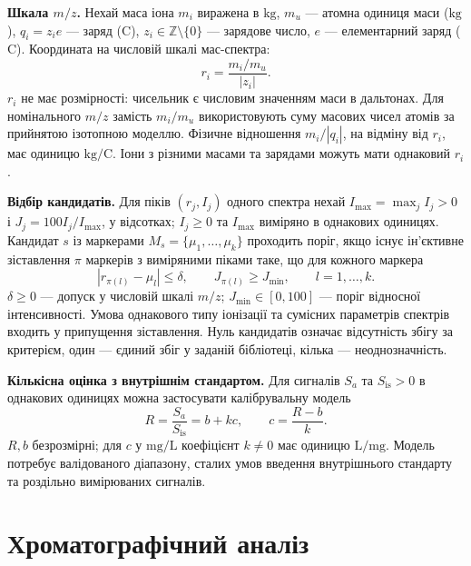 \documentclass[11pt,a4paper]{article}
\begin{document}
\textbf{Шкала \(m/z\).}
Нехай маса іона \(m_i\) виражена в \(\mathrm{kg}\),
\(m_u\) --- атомна одиниця маси (\(\mathrm{kg}\)),
\(q_i=z_i e\) --- заряд (\(\mathrm{C}\)), \(z_i\in\mathbb Z\setminus\{0\}\)
--- зарядове число, \(e\) --- елементарний заряд (\(\mathrm{C}\)).
Координата на числовій шкалі мас-спектра:
\[
  r_i=\frac{m_i/m_u}{|z_i|}.
\]
\(r_i\) не має розмірності: чисельник є числовим значенням
маси в дальтонах. Для номінального \(m/z\) замість \(m_i/m_u\)
використовують суму масових чисел атомів за прийнятою ізотопною
моделлю. Фізичне відношення \(m_i/|q_i|\), на відміну від \(r_i\),
має одиницю \(\mathrm{kg/C}\).
Іони з різними масами та зарядами можуть мати однаковий \(r_i\).

\textbf{Відбір кандидатів.}
Для піків \((r_j,I_j)\) одного спектра нехай
\(I_{\max}=\max_j I_j>0\) і \(J_j=100 I_j/I_{\max}\), у відсотках;
\(I_j\ge0\) та \(I_{\max}\) виміряно в однакових одиницях.
Кандидат \(s\) із маркерами \(M_s=\{\mu_1,\ldots,\mu_k\}\)
проходить поріг, якщо існує ін'єктивне зіставлення \(\pi\)
маркерів з виміряними піками таке, що для кожного маркера
\[
   |r_{\pi(l)}-\mu_l|\le \delta,\qquad
   J_{\pi(l)}\ge J_{\min},\qquad l=1,\ldots,k.
\]
\(\delta\ge0\) --- допуск у числовій шкалі \(m/z\);
\(J_{\min}\in[0,100]\) --- поріг відносної інтенсивності.
Умова однакового типу іонізації та сумісних параметрів
спектрів входить у припущення зіставлення.
Нуль кандидатів означає відсутність збігу за критерієм,
один --- єдиний збіг у заданій бібліотеці,
кілька --- неоднозначність.

\textbf{Кількісна оцінка з внутрішнім стандартом.}
Для сигналів \(S_a\) та \(S_{\mathrm{is}}>0\) в однакових одиницях
можна застосувати калібрувальну модель
\[
  R=\frac{S_a}{S_{\mathrm{is}}}=b+kc,
  \qquad c=\frac{R-b}{k}.
\]
\(R,b\) безрозмірні; для \(c\) у \(\mathrm{mg/L}\)
коефіцієнт \(k\neq0\) має одиницю \(\mathrm{L/mg}\).
Модель потребує валідованого діапазону, сталих умов
введення внутрішнього стандарту та роздільно вимірюваних сигналів.

\section{Хроматографічний аналіз}
\end{document}

